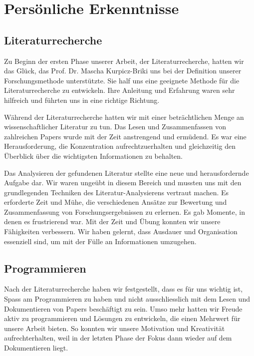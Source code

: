 \section{Persönliche Erkenntnisse}

\subsection{Literaturrecherche}

Zu Beginn der ersten Phase unserer Arbeit, der Literaturrecherche, hatten wir das Glück, das Prof. Dr. Mascha Kurpicz-Briki uns bei der Definition unserer Forschungsmethode unterstützte. 
Sie half uns eine geeignete Methode für die Literaturrecherche zu entwickeln. 
Ihre Anleitung und Erfahrung waren sehr hilfreich und führten uns in eine richtige Richtung.

Während der Literaturrecherche hatten wir mit einer beträchtlichen Menge an wissenschaftlicher Literatur zu tun. 
Das Lesen und Zusammenfassen von zahlreichen Papers wurde mit der Zeit anstrengend und ermüdend. 
Es war eine Herausforderung, die Konzentration aufrechtzuerhalten und gleichzeitig den Überblick über die wichtigsten Informationen zu behalten.

Das Analysieren der gefundenen Literatur stellte eine neue und herausfordernde Aufgabe dar. 
Wir waren ungeübt in diesem Bereich und mussten uns mit den grundlegenden Techniken des Literatur-Analysierens vertraut machen. 
Es erforderte Zeit und Mühe, die verschiedenen Ansätze zur Bewertung und Zusammenfassung von Forschungsergebnissen zu erlernen. 
Es gab Momente, in denen es frustrierend war. Mit der Zeit und Übung konnten wir unsere Fähigkeiten verbessern.
Wir haben gelernt, dass Ausdauer und Organisation essenziell sind, um mit der Fülle an Informationen umzugehen. 

\subsection{Programmieren}

Nach der Literaturrecherche haben wir festgestellt, dass es für uns wichtig ist, Spass am Programmieren zu haben und nicht ausschliesslich mit 
dem Lesen und Dokumentieren von Papers beschäftigt zu sein. 
Umso mehr hatten wir Freude aktiv zu programmieren und Lösungen zu entwickeln, die einen Mehrwert für unsere Arbeit bieten.
So konnten wir unsere Motivation und Kreativität aufrechterhalten, weil in der letzten Phase der Fokus dann wieder auf dem Dokumentieren liegt. 


